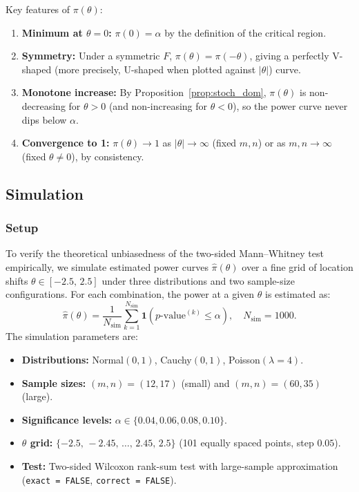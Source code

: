 \documentclass[10pt]{article}
\begin{document}
Key features of $\pi(\theta)$:
\begin{enumerate}[label=(\roman*)]
  \item \textbf{Minimum at $\theta = 0$:}
        $\pi(0) = \alpha$ by the definition of the critical region.
  \item \textbf{Symmetry:}
        Under a symmetric $F$, $\pi(\theta) = \pi(-\theta)$,
        giving a perfectly V-shaped (more precisely, U-shaped when
        plotted against $|\theta|$) curve.
  \item \textbf{Monotone increase:}
        By Proposition~\ref{prop:stoch_dom}, $\pi(\theta)$ is
        non-decreasing for $\theta > 0$ (and non-increasing for
        $\theta < 0$), so the power curve never dips below $\alpha$.
  \item \textbf{Convergence to 1:}
        $\pi(\theta) \to 1$ as $|\theta| \to \infty$ (fixed $m,n$)
        or as $m,n \to \infty$ (fixed $\theta \neq 0$), by
        consistency.
\end{enumerate}

\subsection{Simulation}

\subsubsection{Setup}

To verify the theoretical unbiasedness of the two-sided Mann--Whitney
test empirically, we simulate estimated power curves
$\widehat{\pi}(\theta)$ over a fine grid of location shifts
$\theta \in [-2.5,\, 2.5]$ under three distributions and two
sample-size configurations. For each combination, the power at a
given $\theta$ is estimated as:
\[
  \widehat{\pi}(\theta)
  = \frac{1}{N_{\mathrm{sim}}}
    \sum_{k=1}^{N_{\mathrm{sim}}}
    \mathbf{1}\!\left(p\text{-value}^{(k)} \leq \alpha\right),
  \quad N_{\mathrm{sim}} = 1000.
\]
The simulation parameters are:

\begin{itemize}
  \item \textbf{Distributions:} Normal$(0,1)$, Cauchy$(0,1)$,
        Poisson$(\lambda = 4)$.
  \item \textbf{Sample sizes:} $(m,n) = (12,17)$ (small) and
        $(m,n) = (60,35)$ (large).
  \item \textbf{Significance levels:} $\alpha \in \{0.04, 0.06, 0.08, 0.10\}$.
  \item \textbf{$\theta$ grid:} $\{-2.5,\,-2.45,\,\ldots,\,2.45,\,2.5\}$
        (101 equally spaced points, step $0.05$).
  \item \textbf{Test:} Two-sided Wilcoxon rank-sum test with
        large-sample approximation (\texttt{exact = FALSE},
        \texttt{correct = FALSE}).
\end{itemize}
\end{document}
